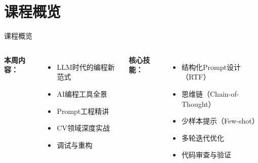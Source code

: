\documentclass[aspectratio=169, 10pt]{beamer}
\begin{document}
\section*{课程概览}
\begin{frame}{课程概览}
	\begin{columns}
		\textbf{本周内容：}
		\begin{itemize}
			\item LLM时代的编程新范式
			\item AI编程工具全景
			\item Prompt工程精讲
			\item CV领域深度实战
			\item 调试与重构
		\end{itemize}

		\textbf{核心技能：}
		\begin{itemize}
			\item 结构化Prompt设计（RTF）
			\item 思维链（Chain-of-Thought）
			\item 少样本提示（Few-shot）
			\item 多轮迭代优化
			\item 代码审查与验证
		\end{itemize}
	\end{columns}
\end{frame}
\end{document}
